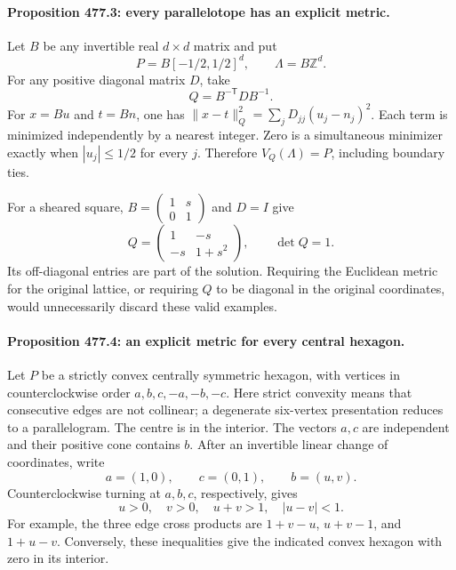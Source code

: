 \documentclass[11pt]{article}
\begin{document}
\paragraph{Proposition 477.3: every parallelotope has an explicit metric.}
Let $B$ be any invertible real $d\times d$ matrix and put
\[
 P=B[-1/2,1/2]^d,\qquad\Lambda=B\mathbb Z^d.
\]
For any positive diagonal matrix $D$, take
\begin{equation}\label{a477:boxmetric}
                             Q=B^{-\mathsf T}DB^{-1}.
\end{equation}
For $x=Bu$ and $t=Bn$, one has
$\|x-t\|_Q^2=\sum_jD_{jj}(u_j-n_j)^2$. Each term is minimized
independently by a nearest integer. Zero is a simultaneous minimizer
exactly when $|u_j|\le1/2$ for every $j$. Therefore
$V_Q(\Lambda)=P$, including boundary ties.

For a sheared square, $B=\left(\begin{smallmatrix}1&s\\0&1\end{smallmatrix}\right)$
and $D=I$ give
\[
              Q=\begin{pmatrix}1&-s\\-s&1+s^2\end{pmatrix},
              \qquad\det Q=1.
\]
Its off-diagonal entries are part of the solution. Requiring the
Euclidean metric for the original lattice, or requiring $Q$ to be
diagonal in the original coordinates, would unnecessarily discard
these valid examples.

\paragraph{Proposition 477.4: an explicit metric for every central hexagon.}
Let $P$ be a strictly convex centrally symmetric hexagon, with vertices
in counterclockwise order
$a,b,c,-a,-b,-c$. Here strict convexity means that consecutive edges
are not collinear; a degenerate six-vertex presentation reduces to a
parallelogram. The centre is in the interior. The vectors $a,c$ are
independent and their positive cone contains $b$. After an invertible
linear change of coordinates, write
\[
                a=(1,0),\qquad c=(0,1),\qquad b=(u,v).
\]
Counterclockwise turning at $a,b,c$, respectively, gives
\begin{equation}\label{a477:hexconditions}
       u>0,\quad v>0,\quad u+v>1,\quad |u-v|<1.
\end{equation}
For example, the three edge cross products are $1+v-u$, $u+v-1$,
and $1+u-v$. Conversely, these inequalities give the indicated convex
hexagon with zero in its interior.
\end{document}
